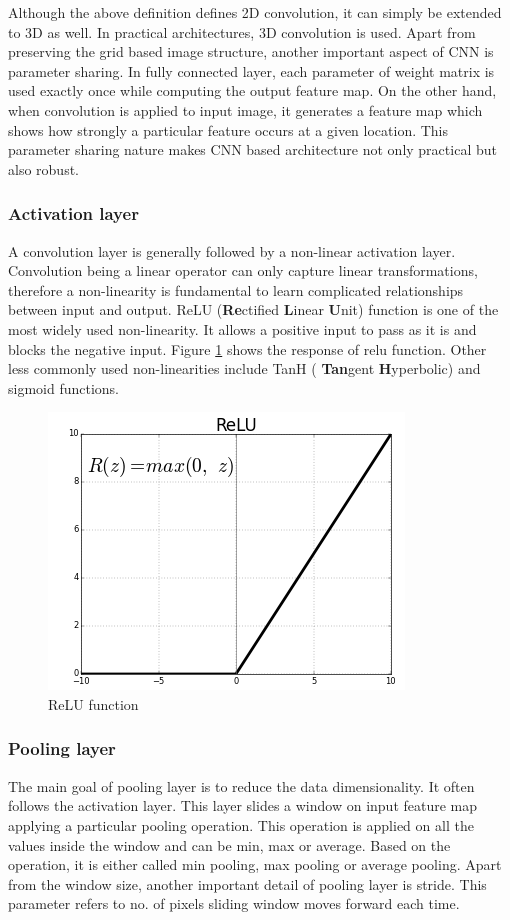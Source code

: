 Although the above definition defines 2D convolution, it can simply be extended to 3D as well. In practical architectures, 3D convolution is used. Apart from preserving the grid based image structure, another important aspect of CNN is parameter sharing. In fully connected layer, each parameter of weight matrix is used exactly once while computing the output feature map. On the other hand, when convolution is applied to input image, it generates a feature map which shows how strongly a particular feature occurs at a given location. This parameter sharing nature makes CNN based architecture not only practical but also robust.  

\subsubsection{Activation layer}
A convolution layer is generally followed by a non-linear activation layer. Convolution being a linear operator can only capture linear transformations, therefore a non-linearity is fundamental to learn complicated relationships between input and output. ReLU (\textbf{Re}ctified \textbf{L}inear \textbf{U}nit) function is one of the most widely used non-linearity. It allows a positive input to pass as it is and blocks the negative input. Figure \ref{fig:relu} shows the response of relu function. Other less commonly used non-linearities include TanH ( \textbf{Tan}gent  \textbf{H}yperbolic) and sigmoid functions.

\begin{figure}
    \centering
    \includegraphics[width=0.7\linewidth]{images/relu.png}
    \caption{ReLU function}
    \label{fig:relu}
\end{figure}


\subsubsection{Pooling layer}
The main goal of pooling layer is to reduce the data dimensionality. It often follows the activation layer. This layer slides a window on input feature map applying a particular pooling operation. This operation is applied on all the values inside the window and can be min, max or average. Based on the operation, it is either called min pooling, max pooling or average pooling. Apart from the window size, another important detail of pooling layer is stride. This parameter refers to no. of pixels sliding window moves forward each time.

